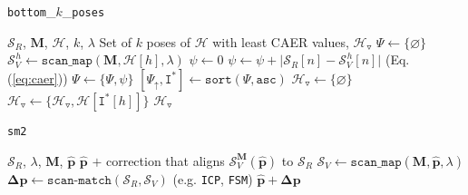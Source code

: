 \begin{algorithm}[]
  \caption{\texttt{bottom}\_$k$\_\texttt{poses}}
  \begin{spacing}{1.0}
  \begin{algorithmic}[1]
    \REQUIRE $\mathcal{S}_R$, $\bm{M}$, $\mathcal{H}$, $k$, $\lambda$
    \ENSURE Set of $k$ poses of $\mathcal{H}$ with least CAER values, $\mathcal{H}_{\triangledown}$
    \STATE $\Psi \leftarrow \{\varnothing \}$
      \STATE $\mathcal{S}_V^{\hspace{1pt} h} \leftarrow \texttt{scan\_map}(\bm{M}, \mathcal{H}[h], \lambda)$
      \STATE $\psi \leftarrow 0$
        \STATE $\psi \leftarrow \psi + \big|\mathcal{S}_R[n]-\mathcal{S}_V^{\hspace{1pt} h}[n]\big|$ \hfill {\small (Eq. (\ref{eq:caer})})
      \ENDFOR
      \STATE $\Psi \leftarrow \{\Psi, \psi\}$
    \ENDFOR
    \STATE $[\Psi_{\uparrow}, \texttt{I}^{\ast}] \leftarrow \texttt{sort}(\Psi, \texttt{asc})$
    \STATE $\mathcal{H}_{\triangledown} \leftarrow \{\varnothing \}$
      \STATE $\mathcal{H}_{\triangledown} \leftarrow \{\mathcal{H}_{\triangledown}, \mathcal{H}[\texttt{I}^{\ast}[h]]\}$
    \ENDFOR
    \RETURN $\mathcal{H}_{\triangledown}$
  \end{algorithmic}
  \end{spacing}
  \label{alg:bottom_k}
\end{algorithm}

\begin{algorithm}[]
  \caption{\texttt{sm2}}
  \begin{spacing}{1.0}
  \begin{algorithmic}[1]
    \REQUIRE $\mathcal{S}_R$, $\lambda$, $\bm{M}$, $\hat{\bm{p}}$
    \ENSURE $\hat{\bm{p}}$ $+$ correction that aligns $\mathcal{S}_V^{\bm{M}}(\hat{\bm{p}})$ to $\mathcal{S}_R$
    \STATE $\mathcal{S}_V \leftarrow \texttt{scan\_map}(\bm{M}, \hat{\bm{p}}, \lambda)$
    \STATE $\bm{\Delta p} \leftarrow \texttt{scan-match}(\mathcal{S}_R,\mathcal{S}_V)$ \hfill {\small (e.g. \texttt{ICP}\cite{Vizzo2023}, \texttt{FSM}\cite{Filotheou2022f}})
    \RETURN $\hat{\bm{p}} + \bm{\Delta p}$
  \end{algorithmic}
  \end{spacing}
  \label{alg:sm2}
\end{algorithm}
